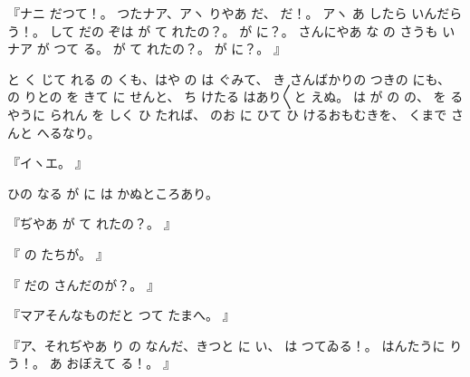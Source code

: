 『ナニ
だつて！。
つたナア、アヽ
りやあ
だ、
だ！。
アヽ
あ
したら
いんだらう！。
して
だの
ぞは
が
て
れたの？。
が
に？。
さんにやあ
な
の
さうも
いナア
が
つて
る。
が
て
れたの？。
が
に？。
』

と
く
じて
れる
の
くも、はや
の
は
ぐみて、
き
さんばかりの
つきの
にも、
の
りとの
を
きて
に
せんと、
ち
けたる
はあり〳〵と
えぬ。
は
が
の
の、
を
るやうに
られん
を
しく
ひ
たれば、
のお
に
ひて
ひ
けるおもむきを、
くまで
さんと
へるなり。

『イヽエ。
』

ひの
なる
が
に
は
かぬところあり。

『ぢやあ
が
て
れたの？。
』

『
の
たちが。
』

『
だの
さんだのが？。
』

『マアそんなものだと
つて
たまへ。
』

『ア、それぢやあ
り
の
なんだ、きつと
に
い、
は
つてゐる！。
はんたうに
り
う！。
あ
おぼえて
る！。
』

